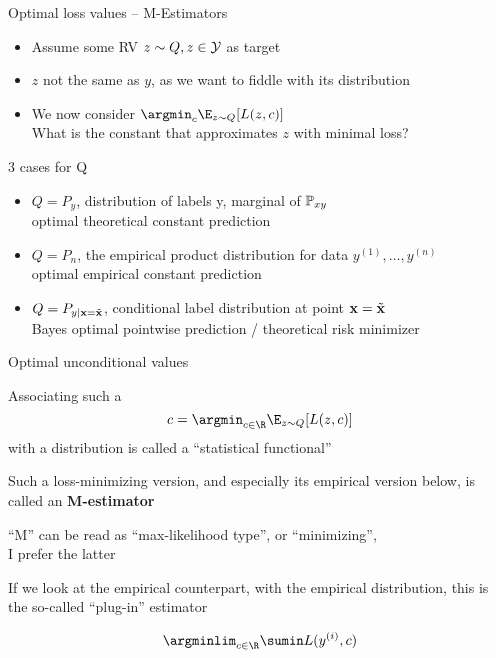 \documentclass[11pt,compress,t,notes=noshow, xcolor=table]{beamer}
\begin{document}
\begin{frame}{Optimal loss values -- M-Estimators}

\begin{itemize}
\item Assume some RV $z \sim Q, z \in \mathcal{Y}$ as target
\item $z$ not the same as $y$, as we want to fiddle with its distribution
\item We now consider $\argmin_c \E_{z \sim Q}[L(z, c)]$\\
What is the constant that approximates $z$ with minimal loss?

\end{itemize}

\vfill

3 cases for Q
\begin{itemize}
\item $Q = P_y$, distribution of labels y, marginal of $\mathbb{P}_{xy}$\\
optimal theoretical constant prediction

\item $Q = P_n$, the empirical product distribution for data $y^{(1)}, \ldots, y^{(n)}$\\
optimal empirical constant prediction

\item $Q = P_{y | \mathbf{x} = \tilde{\mathbf{x}}}$, conditional label distribution at point $\mathbf{x} = \tilde{\mathbf{x}}$\\
Bayes optimal pointwise prediction / theoretical risk minimizer 

\end{itemize}


\end{frame}


\begin{framei}[sep=M]{Optimal unconditional values}

\item Associating such a 
$$c = \argmin_{c \in \R} \E_{z \sim Q}[L(z, c)]$$ with 
a distribution is called a ``statistical functional''

\item Such a loss-minimizing version, and especially its empirical version below, is called an \textbf{M-estimator}\\
\item ``M'' can be read as ``max-likelihood type'', or ``minimizing'',\\
I prefer the latter

\item If we look at the empirical counterpart, with the empirical distribution, this is the so-called ``plug-in'' estimator

$$\argminlim_{c \in \R} \sumin L(\yi,c)$$

\end{framei}
\end{document}
